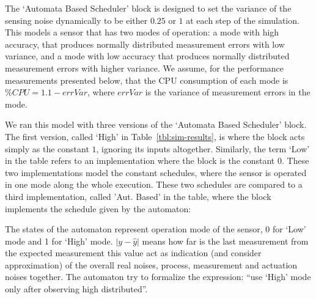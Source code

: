 \documentclass[ twoside, 12pt ]{article}
\begin{document}
The `Automata Based Scheduler' block is designed to set the variance of the sensing noise dynamically to be either $0.25$ or $1$ at each step of the simulation. This models a sensor that has two modes of operation: a mode with high accuracy, that produces normally distributed measurement errors with low variance, and a mode with low accuracy that produces normally distributed measurement errors with higher variance. We assume, for the performance measurements presented below, that the CPU consumption of each mode is $\%CPU=1.1-errVar$, where $errVar$ is the variance of measurement errors in the mode.

We ran this model with three versions of the `Automata Based Scheduler' block. The first version, called `High' in Table~\ref{tbl:sim-results}, is where the block acts simply as the constant $1$, ignoring its inputs altogether. Similarly, the term `Low' in the table refers to an implementation where the block is the constant $0$. These two implementations model the constant schedules, where the sensor is operated in one mode along the whole execution. These two schedules are compared to a third implementation, called 'Aut. Based' in the table, where the block implements the schedule given by the automaton:
\begin{center}
\end{center}
The states of the automaton represent operation mode of the sensor, 0 for `Low' mode and 1 for `High' mode.
$|y-\hat{y}|$ means how far is the last measurement from the expected measurement this value act as indication (and consider approximation) of the overall real noises, process, measurement and actuation noises together.
The automaton try to formalize the expression: ``use `High' mode only after observing high distributed''.

%
%
\end{document}
